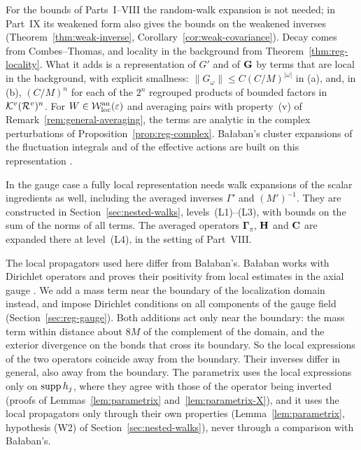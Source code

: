\begin{remark}\label{x:20.3}
For the bounds of Parts~I--VIII the random-walk expansion is not needed; in Part~IX its weakened form also gives the bounds on the weakened inverses (Theorem~\ref{thm:weak-inverse}, Corollary~\ref{cor:weak-covariance}). Decay comes from Combes--Thomas, and locality in the background from Theorem~\ref{thm:reg-locality}. What it adds is a representation of $G'$ and of $\mathbf G$ by terms that are local in the background, with explicit smallness: $\|G_\omega\|\le C(C/M)^{|\omega|}$ in (a), and, in (b), $(C/M)^n$ for each of the $2^n$ regrouped products of bounded factors in $\mathcal K^v(\mathcal R^v)^n$. For $W\in\mathcal W^{\rm an}_{\rm loc}(\varepsilon)$ and averaging pairs with property~(v) of Remark~\ref{rem:general-averaging}, the terms are analytic in the complex perturbations of Proposition~\ref{prop:reg-complex}. Ba\l aban's cluster expansions of the fluctuation integrals and of the effective actions are built on this representation \cite{BalBackground}.

In the gauge case a fully local representation needs walk expansions of the scalar ingredients as well, including the averaged inverses $\Gamma'$ and $(M')^{-1}$. They are constructed in Section~\ref{sec:nested-walks}, levels~(L1)--(L3), with bounds on the sum of the norms of all terms. The averaged operators $\boldsymbol\Gamma_\pi$, $\mathbf H$ and $\mathbf C$ are expanded there at level~(L4), in the setting of Part~VIII.

The local propagators used here differ from Ba\l aban's. Ba\l aban works with Dirichlet operators and proves their positivity from local estimates in the axial gauge \cite[Lemma~2.4]{BalPropII}. We add a mass term near the boundary of the localization domain instead, and impose Dirichlet conditions on all components of the gauge field (Section~\ref{sec:reg-gauge}). Both additions act only near the boundary: the mass term within distance about $8M$ of the complement of the domain, and the exterior divergence on the bonds that cross its boundary. So the local expressions of the two operators coincide away from the boundary. Their inverses differ in general, also away from the boundary. The parametrix uses the local expressions only on $\operatorname{supp} h_j$, where they agree with those of the operator being inverted (proofs of Lemmas~\ref{lem:parametrix} and~\ref{lem:parametrix-X}), and it uses the local propagators only through their own properties (Lemma~\ref{lem:parametrix}, hypothesis (W2) of Section~\ref{sec:nested-walks}), never through a comparison with Ba\l aban's.
\end{remark}
